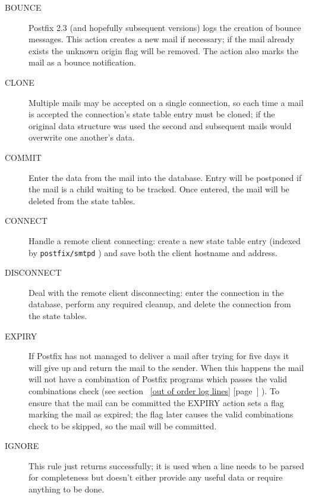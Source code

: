 \documentclass[a4paper,12pt,draft]{article}
\newcommand{\refwithpage}[1]{%
    \empty{}\ref{#1} [page~\pageref{#1}]%
}
\newcommand{\daemon}[1]{%
    \texttt{postfix/#1}%
}
\begin{document}
\begin{description}

    \item [BOUNCE] Postfix 2.3 (and hopefully subsequent versions) logs the
        creation of bounce messages.  This action creates a new mail if
        necessary; if the mail already exists the unknown origin flag will
        be removed.  The action also marks the mail as a bounce
        notification.

    \item [CLONE] Multiple mails may be accepted on a single connection, so
        each time a mail is accepted the connection's state table entry
        must be cloned; if the original data structure was used the second
        and subsequent mails would overwrite one another's data.

    \item [COMMIT] Enter the data from the mail into the database. Entry
        will be postponed if the mail is a child waiting to be tracked.
        Once entered, the mail will be deleted from the state tables.

    \item [CONNECT] Handle a remote client connecting: create a new state
        table entry (indexed by \daemon{smtpd} \pid{}) and save both the
        client hostname and \IP{} address.

    \item [DISCONNECT] Deal with the remote client disconnecting: enter the
        connection in the database, perform any required cleanup, and
        delete the connection from the state tables.

    \item [EXPIRY] If Postfix has not managed to deliver a mail after
        trying for five days it will give up and return the mail to the
        sender.  When this happens the mail will not have a combination of
        Postfix programs which passes the valid combinations check (see
        section~\refwithpage{out of order log lines}).  To ensure that the
        mail can be committed the EXPIRY action sets a flag marking the
        mail as expired; the flag later causes the valid combinations check
        to be skipped, so the mail will be committed.

    \item [IGNORE] This rule just returns successfully; it is used when a
        line needs to be parsed for completeness but doesn't either provide
        any useful data or require anything to be done.


\end{description}
\end{document}
